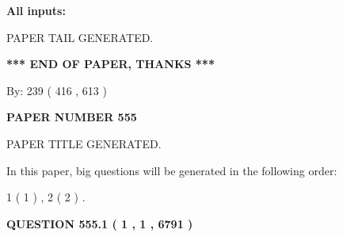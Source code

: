 \documentclass{ctexart}
\begin{document}
   
   
   
\noindent{}
   
   
   
   
\noindent\vspace{0.1in}\hspace{-0.08in} {\textbf{\Large{All inputs: }}}
   
   
   
   
   
   
 \vspace{0.2in}
 
   
   
\vspace{2.0in} PAPER TAIL GENERATED.
   
   
   
   
\vspace{1.0in} 
{\textbf{\large{ *** END OF PAPER, THANKS *** }}} 
   
   
\hspace{1.0in} By: 
 239 ( 416 ,  613 )
   
   
   
   
\newpage 
\setcounter{page}{ 
   555001 } 
   
   
   
   
 {\textbf{ \Large{ PAPER NUMBER  555  }}}
   
   
\vspace{0.2in}
   
   
   
   
   
   
   
   
 \vspace{0.2in}
 
 
 
 
   
   
 PAPER TITLE GENERATED.
   
   
   
\vspace{0.2in}
   
In this paper, big questions will be generated in the following order: 
   
   
   1 ( 1 )
 ,
   2 ( 2 )
 .
  
\vspace{0.2in}
  
{\textbf{\Large{QUESTION
555.1 
 ( 1 , 1 , 6791 )
}}}
  
\end{document}
